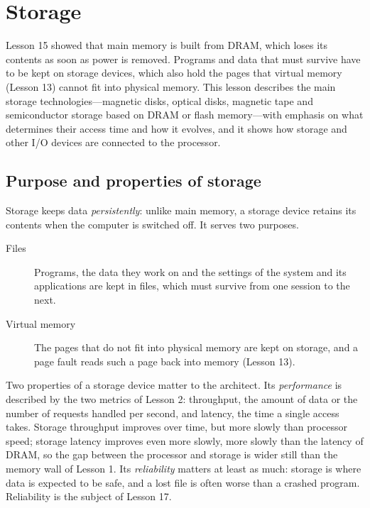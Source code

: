 \documentclass[../main.tex]{subfiles}
\begin{document}
\chapter{Storage}

Lesson 15 showed that main memory is built from DRAM, which loses its
contents as soon as power is removed.  Programs and data that must survive
have to be kept on storage devices, which also hold the pages that virtual
memory (Lesson 13) cannot fit into physical memory.  This lesson describes
the main storage technologies---magnetic disks, optical disks, magnetic tape
and semiconductor storage based on DRAM or flash memory---with emphasis on
what determines their access time and how it evolves, and it shows how
storage and other I/O devices are connected to the processor.

\section{Purpose and properties of storage}
\label{sec:l16-storage}

Storage keeps data \emph{persistently}: unlike main memory, a storage device
retains its contents when the computer is switched off.  It serves two purposes.
\begin{description}
  \item[Files] Programs, the data they work on and the settings of the
    system and its applications are kept in files, which must survive from
    one session to the next.
  \item[Virtual memory] The pages that do not fit into physical memory are
    kept on storage, and a page fault reads such a page back into memory
    (Lesson 13).
\end{description}

Two properties of a storage device matter to the architect.  Its
\emph{performance} is described by the two metrics of Lesson 2: throughput,
the amount of data or the number of requests handled per second, and
latency, the time a single access takes.  Storage throughput improves over
time, but more slowly than processor speed; storage latency improves even
more slowly, more slowly than the latency of DRAM, so the gap between the
processor and storage is wider still than the memory wall of Lesson 1.  Its
\emph{reliability} matters at least as much: storage is where data is
expected to be safe, and a lost file is often worse than a crashed program.
Reliability is the subject of Lesson 17.
\end{document}

